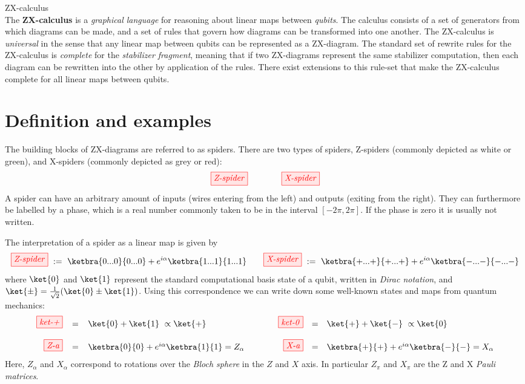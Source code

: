 \documentclass[a4paper, 12pt]{article}
\begin{document}
{\Huge ZX-calculus} \\

The \textbf{ZX-calculus} is a \emph{graphical language} for reasoning about linear maps between \emph{qubits}. The calculus consists of a set of generators from which diagrams can be made, and a set of rules that govern how diagrams can be transformed into one another. The ZX-calculus is \emph{universal} in the sense that any linear map between qubits can be represented as a ZX-diagram. The standard set of rewrite rules for the ZX-calculus is \emph{complete} for the \emph{stabilizer fragment}, meaning that if two ZX-diagrams represent the same stabilizer computation, then each diagram can be rewritten into the other by application of the rules. There exist extensions to this rule-set that make the ZX-calculus complete for all linear maps between qubits.

\section{Definition and examples}
The building blocks of ZX-diagrams are referred to as spiders. There are two types of spiders, Z-spiders (commonly depicted as white or green), and X-spiders (commonly depicted as grey or red):
\begin{equation*}
    \tikzfig{Z-spider} \qquad \qquad \tikzfig{X-spider}
\end{equation*}
A spider can have an arbitrary amount of inputs (wires entering from the left) and outputs (exiting from the right). They can furthermore be labelled by a phase, which is a real number commonly taken to be in the interval $[-2\pi, 2\pi]$. If the phase is zero it is usually not written.

The interpretation of a spider as a linear map is given by
\begin{equation*}
    \tikzfig{Z-spider}\ := \ \ketbra{0...0}{0...0} +
e^{i \alpha} \ketbra{1...1}{1...1} \hfill
\qquad
\hfill \tikzfig{X-spider} \ := \ \ketbra{+...+}{+...+} +
e^{i \alpha} \ketbra{-...-}{-...-}
\end{equation*}
where $\ket{0}$ and $\ket{1}$ represent the standard computational basis state of a qubit, written in \emph{Dirac notation}, and $\ket{\pm} = \frac{1}{\sqrt{2}} (\ket{0} \pm \ket{1})$. Using this correspondence we can write down some well-known states and maps from quantum mechanics:
\begin{equation*}
  \begin{array}{rclcrcl}
  \tikzfig{ket-+} & = & \ket{0} + \ket{1} \ \propto \ket{+} &
  \qquad &
  \tikzfig{ket-0} & = & \ket{+} + \ket{-} \ \propto \ket{0} \\
  &\quad& & & \quad \\
  \tikzfig{Z-a} & = & \ketbra{0}{0} + e^{i \alpha} \ketbra{1}{1} =
  Z_\alpha &
  & 
  \tikzfig{X-a} & = & \ketbra{+}{+} + e^{i \alpha} \ketbra{-}{-} = X_\alpha
  \end{array}
\end{equation*}
Here, $Z_\alpha$ and $X_\alpha$ correspond to rotations over the \emph{Bloch sphere}  in the $Z$ and $X$ axis. In particular $Z_\pi$ and $X_\pi$ are the Z and X \emph{Pauli matrices}.
\end{document}
